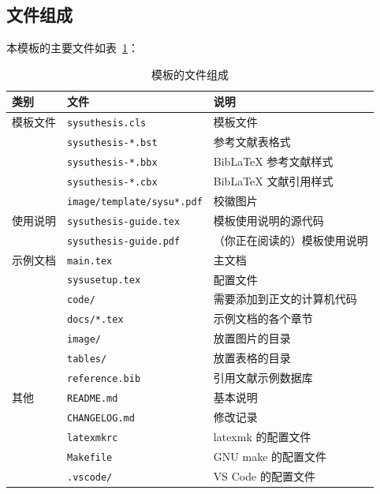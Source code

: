 \documentclass[a4paper]{ltxdoc}
\DeclareRobustCommand\file{\nolinkurl}
\begin{document}
\subsection{文件组成}
本模板的主要文件如表~\ref{tab:files}：
\begin{table}[htb]
  \centering\small
  \caption{模板的文件组成}
  \label{tab:files}
  \begin{tabular}{lll}
    \toprule
    类别     & 文件                      & 说明                         \\
    \midrule
    模板文件 & \file{sysuthesis.cls}     & 模板文件                     \\
             & \file{sysuthesis-*.bst}   & \BibTeX{} 参考文献表格式   \\
             & \file{sysuthesis-*.bbx}   & BibLaTeX 参考文献样式      \\
             & \file{sysuthesis-*.cbx}   & BibLaTeX 文献引用样式      \\
             & \file{image/template/sysu*.pdf} & 校徽图片               \\
    \midrule
    使用说明 & \file{sysuthesis-guide.tex} & 模板使用说明的源代码         \\
             & \file{sysuthesis-guide.pdf} & （你正在阅读的）模板使用说明 \\
    \midrule
    示例文档 & \file{main.tex}           & 主文档                       \\
             & \file{sysusetup.tex}      & 配置文件                     \\
             & \file{code/}          & 需要添加到正文的计算机代码       \\
             & \file{docs/*.tex}     & 示例文档的各个章节           \\
             & \file{image/}           & 放置图片的目录               \\
             & \file{tables/}            & 放置表格的目录               \\
             & \file{reference.bib}       & \BibTeX{} 引用文献示例数据库 \\
    \midrule
    其他     & \file{README.md}          & 基本说明                     \\
             & \file{CHANGELOG.md}       & 修改记录                     \\
             & \file{latexmkrc}          & latexmk 的配置文件           \\
             & \file{Makefile}           & GNU make 的配置文件          \\
             & \file{.vscode/}           & VS Code 的配置文件           \\
    \bottomrule
  \end{tabular}
\end{table}
\end{document}
